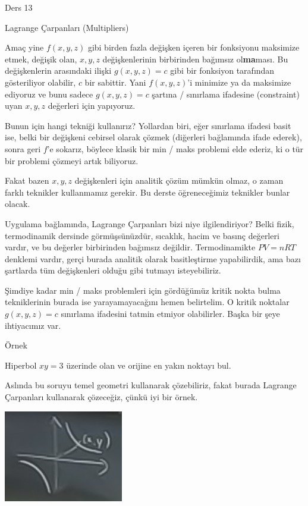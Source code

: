 \documentclass[12pt,fleqn]{article}\usepackage{../../common}
\begin{document}
Ders 13

Lagrange Çarpanları (Multipliers)

Amaç yine $f(x,y,z)$ gibi birden fazla değişken içeren bir fonksiyonu
maksimize etmek, değişik olan, $x,y,z$ değişkenlerinin birbirinden bağımsız
ol\textbf{ma}ması. Bu değişkenlerin arasındaki ilişki $g(x,y,z)=c$ gibi bir
fonksiyon tarafından gösteriliyor olabilir, $c$ bir sabittir. Yani
$f(x,y,z)$'i minimize ya da maksimize ediyoruz ve bunu sadece $g(x,y,z)=c$
şartına / sınırlama ifadesine (constraint) uyan $x,y,z$ değerleri için
yapıyoruz.

Bunun için hangi tekniği kullanırız? Yollardan biri, eğer sınırlama ifadesi
basit ise, belki bir değişkeni cebirsel olarak çözmek (diğerleri
bağlamında ifade ederek), sonra geri $f$'e sokarız, böylece klasik bir min
/ maks problemi elde ederiz, ki o tür bir problemi çözmeyi artık biliyoruz.

Fakat bazen $x,y,z$ değişkenleri için analitik çözüm mümkün olmaz, o zaman
farklı teknikler kullanmamız gerekir. Bu derste öğreneceğimiz teknikler
bunlar olacak. 

Uygulama bağlamında, Lagrange Çarpanları bizi niye ilgilendiriyor? Belki
fizik, termodinamik dersinde görmüşsünüzdür, sıcaklık, hacim ve basınç
değerleri vardır, ve bu değerler birbirinden bağımsız
değildir. Termodinamikte $PV=nRT$ denklemi vardır, gerçi burada analitik
olarak basitleştirme yapabilirdik, ama bazı şartlarda tüm değişkenleri
olduğu gibi tutmayı isteyebiliriz. 

Şimdiye kadar min / maks problemleri için gördüğümüz kritik nokta bulma
tekniklerinin burada ise yarayamayacağını hemen belirtelim. O kritik noktalar
$g(x,y,z)=c$ sınırlama ifadesini tatmin etmiyor olabilirler. Başka bir şeye
ihtiyacımız var. 

Örnek

Hiperbol $xy =3$ üzerinde olan ve orijine en yakın noktayı bul. 

Aslında bu soruyu temel geometri kullanarak çözebiliriz, fakat burada
Lagrange Çarpanları kullanarak çözeceğiz, çünkü iyi bir örnek.

\begin{center}
\includegraphics[height=4cm]{13_1.png}
\end{center}
\end{document}
